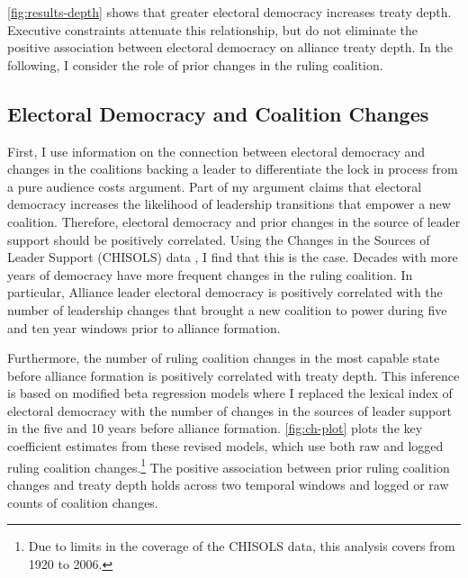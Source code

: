 \documentclass[12pt]{article}
\begin{document}
\autoref{fig:results-depth} shows that greater electoral democracy increases treaty depth. 
Executive constraints attenuate this relationship, but do not eliminate the positive association between electoral democracy on alliance treaty depth. 
In the following, I consider the role of prior changes in the ruling coalition. 


\subsection{Electoral Democracy and Coalition Changes}


First, I use information on the connection between electoral democracy and changes in the coalitions backing a leader to differentiate the lock in process from a pure audience costs argument.
Part of my argument claims that electoral democracy increases the likelihood of leadership transitions that empower a new coalition. 
Therefore, electoral democracy and prior changes in the source of leader support should be positively correlated.
Using the Changes in the Sources of Leader Support (CHISOLS) data \citep{Mattesetal2016}, I find that this is the case. 
Decades with more years of democracy have more frequent changes in the ruling coalition. 
In particular, Alliance leader electoral democracy is positively correlated with the number of leadership changes that brought a new coalition to power during five and ten year windows prior to alliance formation. 


Furthermore, the number of ruling coalition changes in the most capable state before alliance formation is positively correlated with treaty depth. 
This inference is based on modified beta regression models where I replaced the lexical index of electoral democracy with the number of changes in the sources of leader support in the five and 10 years before alliance formation. 
\autoref{fig:ch-plot} plots the key coefficient estimates from these revised models, which use both raw and logged ruling coalition changes.\footnote{Due to limits in the coverage of the CHISOLS data, this analysis covers from 1920 to 2006.}
The positive association between prior ruling coalition changes and treaty depth holds across two temporal windows and logged or raw counts of coalition changes.
\end{document}
